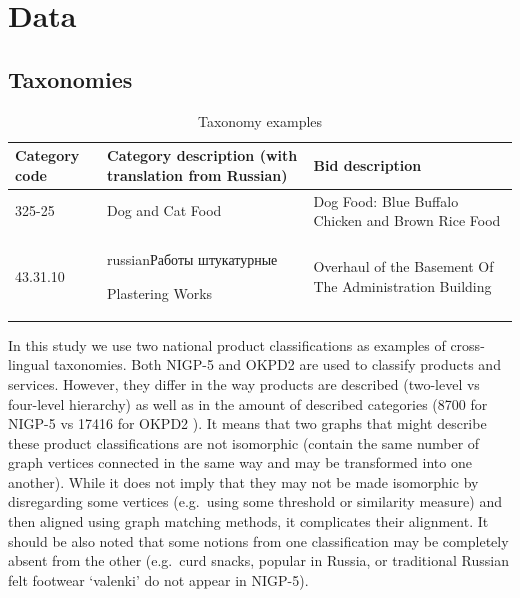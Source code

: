 \documentclass[11pt,a4paper]{article}
\begin{document}
\section{Data}
\subsection{Taxonomies}

\begin{center}
	\begin{table}[!htbp]
		\small
		\caption{Taxonomy examples}
		\label{table-taxonomies}
                \centering
                \begin{tabular}{|p{1cm}|p{2.5cm}|p{2.5cm}|}
                        \hline
                        Category code & Category description \newline (with translation from Russian) & Bid description\\
                        \hline
                        325-25 & Dog and Cat Food & Dog Food: Blue Buffalo Chicken and Brown Rice Food\\
                        \hline
                        43.31.10 & \begin{otherlanguage*}{russian}Работы штукатурные\end{otherlanguage*} \newline Plastering Works & Overhaul of the Basement Of The Administration Building\\
                        \hline
                \end{tabular}
        \end{table}
\end{center}

In this study we use two national product classifications as examples of cross-lingual taxonomies.
Both NIGP-5 and OKPD2 are used to classify products and services. However, they differ in the way products are described (two-level vs four-level hierarchy) as well as in the amount of described categories (8700 for NIGP-5 \cite{wiki-nigp} vs 17416 for OKPD2 \cite{wiki-okpd}). It means that two graphs that might describe these product classifications are not isomorphic (contain the same number of graph vertices connected in the same way and may be transformed into one another).  While it does not imply that they may not be made isomorphic by disregarding some vertices (e.g.\ using some threshold or similarity measure) and then aligned using graph matching methods, it complicates their alignment. It should be also noted that some notions from one classification may be completely absent from the other (e.g.\ curd snacks, popular in Russia, or traditional Russian felt footwear `valenki' do not appear in NIGP-5).
\end{document}
